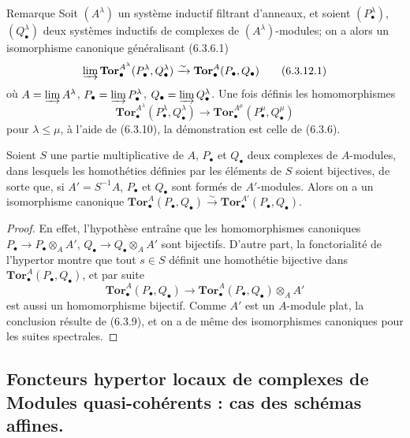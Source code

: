 \begin{namedtheorem}[6.3.12]{Remarque}
Soit $(A^\lambda)$ un système inductif filtrant d'anneaux, et soient
$(P_\bullet^\lambda)$, $(Q_\bullet^\lambda)$ deux systèmes inductifs de
complexes de $(A^\lambda)$-modules; on a alors un isomorphisme canonique
généralisant (6.3.6.1)
\[
  \varinjlim
  \mathbf{Tor}_\bullet^{A^\lambda}
  (P_\bullet^\lambda,Q_\bullet^\lambda)
  \xrightarrow{\sim}
  \mathbf{Tor}_\bullet^A(P_\bullet,Q_\bullet)
  \tag{6.3.12.1}\label{III.6.3.12.1.fr}
\]
où $A=\varinjlim A^\lambda$, $P_\bullet=\varinjlim P_\bullet^\lambda$,
$Q_\bullet=\varinjlim Q_\bullet^\lambda$. Une fois définis les
homomorphismes
\[
  \mathbf{Tor}_\bullet^{A^\lambda}
  (P_\bullet^\lambda,Q_\bullet^\lambda)
  \longrightarrow
  \mathbf{Tor}_\bullet^{A^\mu}
  (P_\bullet^\mu,Q_\bullet^\mu)
\]
pour $\lambda\leqslant\mu$, à l'aide de (6.3.10), la démonstration est celle
de (6.3.6).
\end{namedtheorem}

\begin{proposition}[6.3.13]
Soient $S$ une partie multiplicative de $A$, $P_\bullet$ et $Q_\bullet$ deux
complexes de $A$-modules, dans lesquels les homothéties définies par les
éléments de $S$ soient bijectives, de sorte que, si $A'=S^{-1}A$,
$P_\bullet$ et $Q_\bullet$ sont formés de $A'$-modules. Alors on a un
isomorphisme canonique
$\mathbf{Tor}_\bullet^A(P_\bullet,Q_\bullet)
\xrightarrow{\sim}
\mathbf{Tor}_\bullet^{A'}(P_\bullet,Q_\bullet)$.
\end{proposition}

\begin{proof}
En effet, l'hypothèse entraîne que les homomorphismes canoniques
$P_\bullet\to P_\bullet\otimes_A A'$,
$Q_\bullet\to Q_\bullet\otimes_A A'$ sont bijectifs. D'autre part, la
fonctorialité de l'hypertor montre que tout $s\in S$ définit une homothétie
bijective dans $\mathbf{Tor}_\bullet^A(P_\bullet,Q_\bullet)$, et par suite
\[
  \mathbf{Tor}_\bullet^A(P_\bullet,Q_\bullet)
  \longrightarrow
  \mathbf{Tor}_\bullet^A(P_\bullet,Q_\bullet)\otimes_A A'
\]
est aussi un homomorphisme bijectif. Comme $A'$ est un $A$-module plat, la
conclusion résulte de (6.3.9), et on a de même des isomorphismes canoniques
pour les suites spectrales.
\end{proof}

\subsection{Foncteurs hypertor locaux de complexes de Modules quasi-cohérents : cas des schémas affines.}

